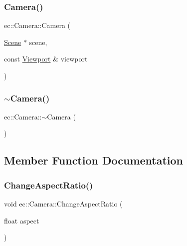 \subsubsection{\texorpdfstring{Camera()}{Camera()}\hspace{0.1cm}{\footnotesize\ttfamily [2/2]}}
{\footnotesize\ttfamily ec\+::\+Camera\+::\+Camera (\begin{DoxyParamCaption}\item[{\mbox{\hyperlink{classec_1_1_scene}{Scene}} $\ast$}]{scene,  }\item[{const \mbox{\hyperlink{classec_1_1_viewport}{Viewport}} \&}]{viewport }\end{DoxyParamCaption})\hspace{0.3cm}{\ttfamily [explicit]}}

\mbox{\label{classec_1_1_camera_a11d706554e37d6dde0b9313a445cbd4b}} 
\subsubsection{\texorpdfstring{$\sim$\+Camera()}{~Camera()}}
{\footnotesize\ttfamily ec\+::\+Camera\+::$\sim$\+Camera (\begin{DoxyParamCaption}{ }\end{DoxyParamCaption})}



\subsection{Member Function Documentation}
\mbox{\label{classec_1_1_camera_ad3790ce4b558aa906fe00e25d8c8c1ed}} 
\subsubsection{\texorpdfstring{Change\+Aspect\+Ratio()}{ChangeAspectRatio()}}
{\footnotesize\ttfamily void ec\+::\+Camera\+::\+Change\+Aspect\+Ratio (\begin{DoxyParamCaption}\item[{float}]{aspect }\end{DoxyParamCaption})}

